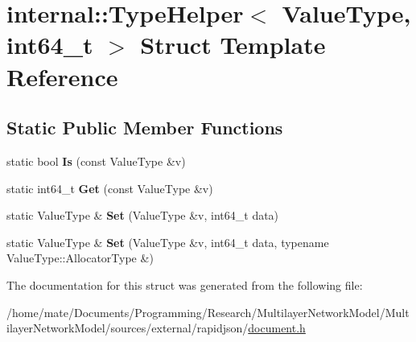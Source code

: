 \hypertarget{structinternal_1_1TypeHelper_3_01ValueType_00_01int64__t_01_4}{}\section{internal\+:\+:Type\+Helper$<$ Value\+Type, int64\+\_\+t $>$ Struct Template Reference}
\label{structinternal_1_1TypeHelper_3_01ValueType_00_01int64__t_01_4}
\subsection*{Static Public Member Functions}
\begin{DoxyCompactItemize}
\item 
static bool {\bfseries Is} (const Value\+Type \&v)\hypertarget{structinternal_1_1TypeHelper_3_01ValueType_00_01int64__t_01_4_a43c171bfbe873941a1b2be698a95de74}{}\label{structinternal_1_1TypeHelper_3_01ValueType_00_01int64__t_01_4_a43c171bfbe873941a1b2be698a95de74}

\item 
static int64\+\_\+t {\bfseries Get} (const Value\+Type \&v)\hypertarget{structinternal_1_1TypeHelper_3_01ValueType_00_01int64__t_01_4_abe3368c8817cafe420a8b3f7d6ec1759}{}\label{structinternal_1_1TypeHelper_3_01ValueType_00_01int64__t_01_4_abe3368c8817cafe420a8b3f7d6ec1759}

\item 
static Value\+Type \& {\bfseries Set} (Value\+Type \&v, int64\+\_\+t data)\hypertarget{structinternal_1_1TypeHelper_3_01ValueType_00_01int64__t_01_4_a0c7b71569c12346902a396111782b12b}{}\label{structinternal_1_1TypeHelper_3_01ValueType_00_01int64__t_01_4_a0c7b71569c12346902a396111782b12b}

\item 
static Value\+Type \& {\bfseries Set} (Value\+Type \&v, int64\+\_\+t data, typename Value\+Type\+::\+Allocator\+Type \&)\hypertarget{structinternal_1_1TypeHelper_3_01ValueType_00_01int64__t_01_4_a85471fa774b4a8f4f56c191694a7f278}{}\label{structinternal_1_1TypeHelper_3_01ValueType_00_01int64__t_01_4_a85471fa774b4a8f4f56c191694a7f278}

\end{DoxyCompactItemize}


The documentation for this struct was generated from the following file\+:\begin{DoxyCompactItemize}
\item 
/home/mate/\+Documents/\+Programming/\+Research/\+Multilayer\+Network\+Model/\+Multilayer\+Network\+Model/sources/external/rapidjson/\hyperlink{document_8h}{document.\+h}\end{DoxyCompactItemize}
